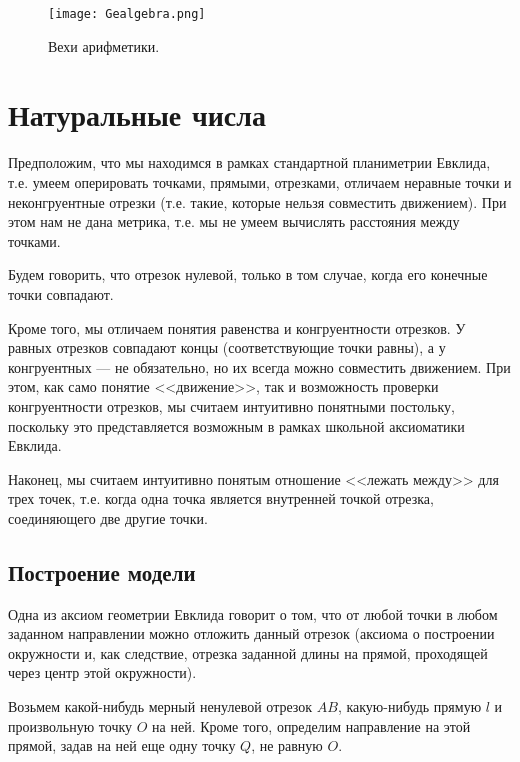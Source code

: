 
\begin{figure}[htb!]
\begin{center}
\texttt{[image: Gealgebra.png]}
\end{center}
\caption{Вехи арифметики.}\label{ariphmetics}
\end{figure}



\section{Натуральные числа}



Предположим, что мы находимся в рамках стандартной планиметрии Евклида, т.е. умеем оперировать точками, прямыми, отрезками, отличаем неравные точки и неконгруентные отрезки (т.е. такие, которые нельзя совместить движением). При этом нам не дана метрика, т.е. мы не умеем вычислять расстояния между точками.

Будем говорить, что отрезок нулевой, только в том случае, когда его конечные точки совпадают.

Кроме того, мы отличаем понятия равенства и конгруентности отрезков. У равных отрезков совпадают концы (соответствующие точки равны), а у конгруентных --- не обязательно, но их всегда можно совместить движением. При этом, как само понятие <<движение>>, так и возможность проверки конгруентности отрезков, мы считаем интуитивно понятными постольку, поскольку это представляется возможным в рамках школьной аксиоматики Евклида.

Наконец, мы считаем интуитивно понятым отношение <<лежать между>> для трех точек, т.е. когда одна точка является внутренней точкой отрезка, соединяющего две другие точки.


\subsection{Построение модели}

Одна из аксиом геометрии Евклида говорит о том, что от любой точки в любом заданном направлении можно отложить данный отрезок (аксиома о построении окружности и, как следствие, отрезка заданной длины на прямой, проходящей через центр этой окружности).

Возьмем какой-нибудь мерный ненулевой отрезок $AB$, какую-нибудь прямую $l$ и произвольную точку $O$ на ней. Кроме того, определим направление на этой прямой, задав на ней еще одну точку $Q$, не равную $O$.

